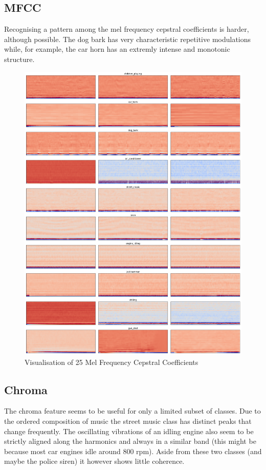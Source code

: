 \subsection{MFCC}

Recognising a pattern among the mel frequency cepstral coefficients is harder, although possible. The dog bark has very characteristic repetitive modulations while, for example, the car horn has an extremly intense and monotonic structure.

\begin{figure}[H]
    \centering
	\includegraphics[width=.8\textwidth]{./images/features/mfcc-25}
    \caption{Visualisation of 25 Mel Frequency Cepstral Coefficients}
    \label{fig:mfcc}
\end{figure}



\subsection{Chroma}

The chroma feature seems to be useful for only a limited subset of classes. Due to the ordered composition of music the street music class has distinct peaks that change frequently. The oscillating vibrations of an idling engine also seem to be strictly aligned along the harmonics and always in a similar band (this might be because most car engines idle around 800 rpm). Aside from these two classes (and maybe the police siren) it however shows little coherence.



